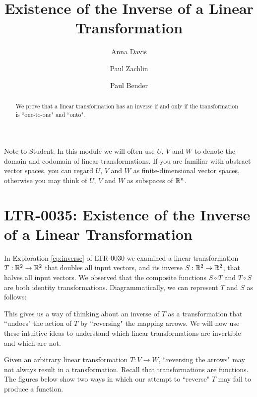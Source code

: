 \documentclass{ximera}
\author{Anna Davis \and Paul Zachlin \and Paul Bender} \title{Existence of the Inverse of a Linear Transformation} \license{CC-BY 4.0}
\begin{document}
\begin{abstract}
  We prove that a linear transformation has an inverse if and only if the transformation is ``one-to-one" and ``onto".
\end{abstract}
\maketitle

Note to Student:  In this module we will often use $U$, $V$ and $W$ to denote the domain and codomain of linear transformations.  If you are familiar with abstract vector spaces, you can regard $U$, $V$ and $W$ as finite-dimensional vector spaces, otherwise you may think of $U$, $V$ and $W$ as subspaces of $\mathbb{R}^n$. 

\section{LTR-0035: Existence of the Inverse of a Linear Transformation}

In Exploration \ref{ep:inverse} of LTR-0030 we examined a linear transformation $T:\mathbb{R}^2\rightarrow \mathbb{R}^2$ that doubles all input vectors, and its inverse $S:\mathbb{R}^2\rightarrow \mathbb{R}^2$, that halves all input vectors.  We observed that the composite functions $S\circ T$ and $T\circ S$ are both identity transformations.  Diagrammatically, we can represent $T$ and $S$ as follows:
 
\begin{center}
 \end{center} 

This gives us a way of thinking about an inverse of $T$ as a transformation that ``undoes" the action of $T$ by ``reversing" the mapping arrows.  We will now use these intuitive ideas to understand which linear transformations are invertible and which are not.

Given an arbitrary linear transformation $T:V\rightarrow W$, ``reversing the arrows"
 may not always result in a transformation. Recall that transformations are functions.  The figures below show two ways in which our attempt to ``reverse" $T$ may fail to produce a function.
 
\end{document}
